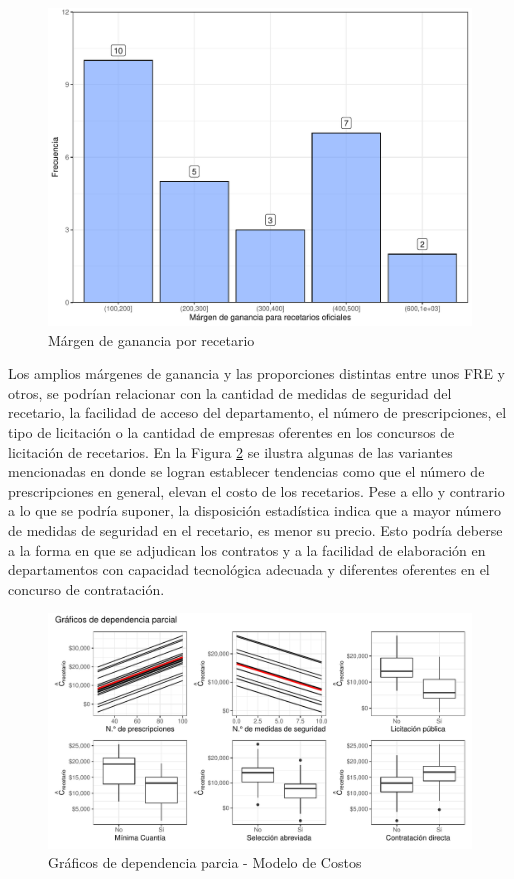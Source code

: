 \documentclass[
]{book}
\begin{document}
\begin{figure}

{\centering \includegraphics[width=1\linewidth]{InformeFinal_files/figure-latex/comparativoDepartamentos0-1} 

}

\caption{Márgen de ganancia por recetario}\label{fig:comparativoDepartamentos0}
\end{figure}

Los amplios márgenes de ganancia y las proporciones distintas entre unos FRE y otros, se podrían relacionar con la cantidad de medidas de seguridad del recetario, la facilidad de acceso del departamento, el número de prescripciones, el tipo de licitación o la cantidad de empresas oferentes en los concursos de licitación de recetarios. En la Figura \ref{fig:DependParcial1} se ilustra algunas de las variantes mencionadas en donde se logran establecer tendencias como que el número de prescripciones en general, elevan el costo de los recetarios. Pese a ello y contrario a lo que se podría suponer, la disposición estadística indica que a mayor número de medidas de seguridad en el recetario, es menor su precio. Esto podría deberse a la forma en que se adjudican los contratos y a la facilidad de elaboración en departamentos con capacidad tecnológica adecuada y diferentes oferentes en el concurso de contratación.

\begin{figure}
\includegraphics[width=0.9\linewidth]{InformeFinal_files/figure-latex/DependParcial1-1} \caption{Gráficos de dependencia parcia - Modelo de Costos}\label{fig:DependParcial1}
\end{figure}
\end{document}
